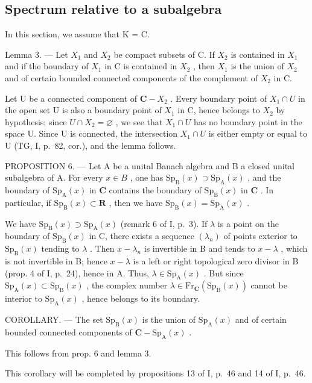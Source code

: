 \subsection{Spectrum relative to a subalgebra}

In this section, we assume that K = C.

Lemma 3. --- Let \(X_{1}\) and \(X_{2}\) be compact subsets of C. If \(X_{2}\) is contained in \(X_{1}\) and if the boundary of \(X_{1}\) in C is contained in \(X_{2}\) , then \(X_{1}\) is the union of \(X_{2}\) and of certain bounded connected components of the complement of \(X_{2}\) in C.

Let U be a connected component of \(\mathbf{C}-X_{2}\) . Every boundary point of \(X_{1} \cap U\) in the open set U is also a boundary point of \(X_{1}\) in C, hence belongs to \(X_{2}\) by hypothesis; since \(U \cap X_{2} = \varnothing\) , we see that \(X_{1} \cap U\) has no boundary point in the space U. Since U is connected, the intersection \(X_{1} \cap U\) is either empty or equal to U (TG, I, p.~82, cor.), and the lemma follows.

PROPOSITION 6. — Let A be a unital Banach algebra and B a closed unital subalgebra of A. For every \(x \in B\) , one has \(\mathrm{Sp}_{\mathrm{B}}(x) \supset \mathrm{Sp}_{\mathrm{A}}(x)\) , and the boundary of \(\mathrm{Sp}_{\mathrm{A}}(x)\) in \(\mathbf{C}\) contains the boundary of \(\mathrm{Sp}_{\mathrm{B}}(x)\) in \(\mathbf{C}\) . In particular, if \(\mathrm{Sp}_{\mathrm{B}}(x) \subset \mathbf{R}\) , then we have \(\mathrm{Sp}_{\mathrm{B}}(x) = \mathrm{Sp}_{\mathrm{A}}(x)\) .

We have \(\mathrm{Sp}_{\mathrm{B}}(x) \supset \mathrm{Sp}_{\mathrm{A}}(x)\) (remark 6 of I, p.~3). If \(\lambda\) is a point on the boundary of \(\mathrm{Sp}_{\mathrm{B}}(x)\) in C, there exists a sequence \((\lambda_{n})\) of points exterior to \(\mathrm{Sp}_{\mathrm{B}}(x)\) tending to \(\lambda\) . Then \(x - \lambda_{n}\) is invertible in B and tends to \(x - \lambda\) , which is not invertible in B; hence \(x - \lambda\) is a left or right topological zero divisor in B (prop. 4 of I, p.~24), hence in A. Thus, \(\lambda \in \mathrm{Sp}_{\mathrm{A}}(x)\) . But since \(\mathrm{Sp}_{\mathrm{A}}(x) \subset \mathrm{Sp}_{\mathrm{B}}(x)\) , the complex number \(\lambda \in \mathrm{Fr}_{\mathbf{C}}(\mathrm{Sp}_{\mathrm{B}}(x))\) cannot be interior to \(\mathrm{Sp}_{\mathrm{A}}(x)\) , hence belongs to its boundary.

COROLLARY. --- The set \(\mathrm{Sp}_{\mathrm{B}}(x)\) is the union of \(\mathrm{Sp}_{\mathrm{A}}(x)\) and of certain bounded connected components of \(\mathbf{C}-\mathrm{Sp}_{\mathrm{A}}(x)\) .

This follows from prop. 6 and lemma 3.

This corollary will be completed by propositions 13 of I, p.~46 and 14 of I, p.~46.

